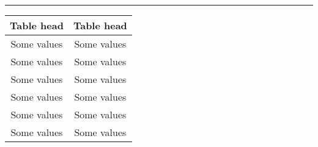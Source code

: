 \documentclass[11pt,a4paper,english]{article}
\begin{document}
  \begin{minipage}{\textwidth}
  \begin{minipage}[b]{0.49\textwidth}
    \centering
    \rule{6.4cm}{3.6cm}
  \end{minipage}
  \hfill
  \begin{minipage}[b]{0.49\textwidth}
    \centering
    \begin{tabular}{cc}\hline
      Table head & Table head \\ \hline
        Some values & Some values \\
        Some values & Some values \\
        Some values & Some values \\
        Some values & Some values \\
        Some values & Some values \\
        Some values & Some values \\ \hline
      \end{tabular}
    \end{minipage}
  \end{minipage}
\end{document}
